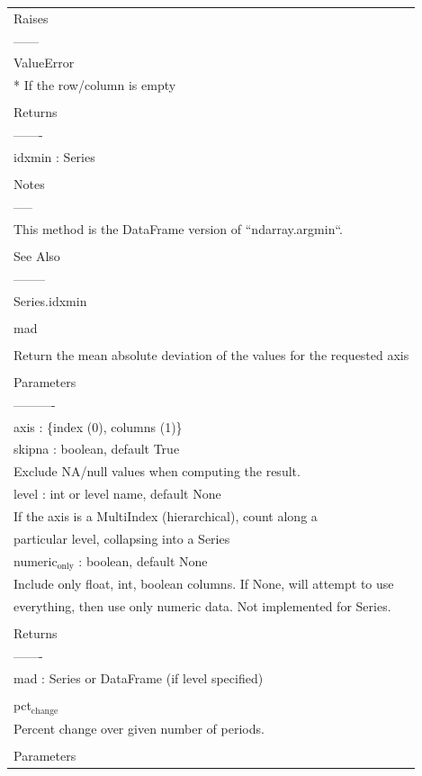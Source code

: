 \documentclass[11pt]{article}
\begin{document}
\begin{enumerate}
\begin{enumerate}
\begin{enumerate}
\begin{center}
\begin{tabular}{l}
Raises\\
------\\
ValueError\\
* If the row/column is empty\\
\\
Returns\\
-------\\
idxmin : Series\\
\\
Notes\\
-----\\
This method is the DataFrame version of ``ndarray.argmin``.\\
\\
See Also\\
--------\\
Series.idxmin\\
\\
mad\\
\\
Return the mean absolute deviation of the values for the requested axis\\
\\
Parameters\\
----------\\
axis : \{index (0), columns (1)\}\\
skipna : boolean, default True\\
Exclude NA/null values when computing the result.\\
level : int or level name, default None\\
If the axis is a MultiIndex (hierarchical), count along a\\
particular level, collapsing into a Series\\
numeric\(_{\text{only}}\) : boolean, default None\\
Include only float, int, boolean columns. If None, will attempt to use\\
everything, then use only numeric data. Not implemented for Series.\\
\\
Returns\\
-------\\
mad : Series or DataFrame (if level specified)\\
\\
pct\(_{\text{change}}\)\\
Percent change over given number of periods.\\
\\
Parameters\\

\end{tabular}
\end{center}
\end{enumerate}
\end{enumerate}
\end{enumerate}
\end{document}
